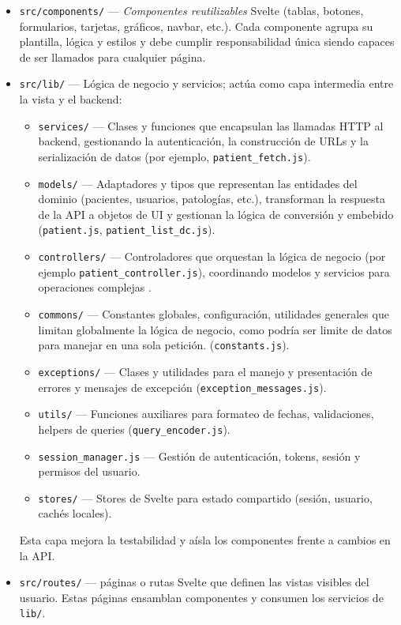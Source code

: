 \documentclass[12pt, a4paper]{article}
\begin{document}
\begin{itemize}
	\item \texttt{src/components/} — \emph{Componentes reutilizables} Svelte (tablas, botones, formularios, tarjetas, gráficos, navbar, etc.). Cada componente agrupa su plantilla, lógica y estilos y debe cumplir responsabilidad única siendo capaces de ser llamados para cualquier página.
	\item \texttt{src/lib/} — Lógica de negocio y servicios; actúa como capa intermedia entre la vista y el backend:
	\begin{itemize}
		\item \texttt{services/} — Clases y funciones que encapsulan las llamadas HTTP al backend, gestionando la autenticación, la construcción de URLs y la serialización de datos (por ejemplo, \texttt{patient\_fetch.js}).
		\item \texttt{models/} — Adaptadores y tipos que representan las entidades del dominio (pacientes, usuarios, patologías, etc.), transforman la respuesta de la API a objetos de UI y gestionan la lógica de conversión y embebido (\texttt{patient.js}, \texttt{patient\_list\_dc.js}).
		\item \texttt{controllers/} — Controladores que orquestan la lógica de negocio (por ejemplo \texttt{patient\_controller.js}), coordinando modelos y servicios para operaciones complejas .
		\item \texttt{commons/} — Constantes globales, configuración, utilidades generales que limitan globalmente la lógica de negocio, como podría ser limite de datos para manejar en una sola petición. (\texttt{constants.js}).
		\item \texttt{exceptions/} — Clases y utilidades para el manejo y presentación de errores y mensajes de excepción (\texttt{exception\_messages.js}).
		\item \texttt{utils/} — Funciones auxiliares para formateo de fechas, validaciones, helpers de queries (\texttt{query\_encoder.js}).
		\item \texttt{session\_manager.js} — Gestión de autenticación, tokens, sesión y permisos del usuario.
		\item \texttt{stores/} — Stores de Svelte para estado compartido (sesión, usuario, cachés locales).
	\end{itemize}
	
	Esta capa mejora la testabilidad y aísla los componentes frente a cambios en la API.
	\item \texttt{src/routes/} — páginas o rutas Svelte que definen las vistas visibles del usuario. Estas páginas ensamblan componentes y consumen los servicios de \texttt{lib/}.
\end{itemize}
\end{document}
